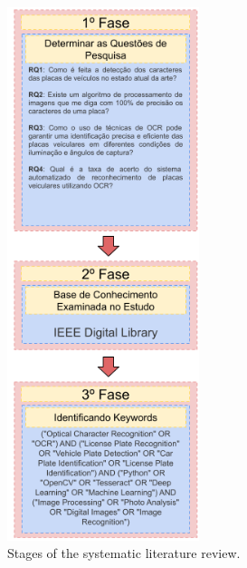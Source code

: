 \documentclass[conference]{IEEEtran}
\begin{document}
	\begin{figure}[htbp]
		\centerline{\includegraphics[width=0.5\textwidth]{img1.png}}
		\caption{Stages of the systematic literature review.}
		\label{img1}
	\end{figure}
	
\end{document}
